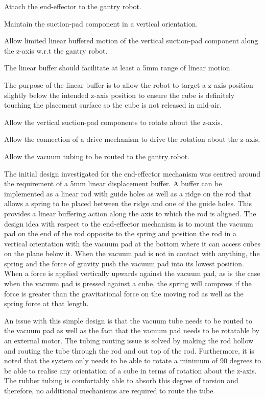 \begin{compactitem}
	\item Attach the end-effector to the gantry robot.
	\item Maintain the suction-pad component in a vertical orientation.
	\item Allow limited linear buffered motion of the vertical suction-pad component along the z-axis w.r.t the gantry robot.
	\item The linear buffer should facilitate at least a 5mm range of linear motion.
	\item The purpose of the linear buffer is to allow the robot to target a z-axis position slightly below the intended z-axis position to ensure the cube is definitely touching the placement surface so the cube is not released in mid-air.
	\item Allow the vertical suction-pad components to rotate about the z-axis.
	\item Allow the connection of a drive mechanism to drive the rotation about the z-axis.
	\item Allow the vacuum tubing to be routed to the gantry robot.
\end{compactitem}

The initial design investigated for the end-effector mechanism was centred around the requirement of a 5mm linear displacement buffer. A buffer can be implemented as a linear rod with guide holes as well as a ridge on the rod that allows a spring to be placed between the ridge and one of the guide holes. This provides a linear buffering action along the axis to which the rod is aligned. The design idea with respect to the end-effector mechanism is to mount the vacuum pad on the end of the rod opposite to the spring and position the rod in a vertical orientation with the vacuum pad at the bottom where it can access cubes on the plane below it. When the vacuum pad is not in contact with anything, the spring and the force of gravity push the vacuum pad into its lowest position. When a force is applied vertically upwards against the vacuum pad, as is the case when the vacuum pad is pressed against a cube, the spring will compress if the force is greater than the gravitational force on the moving rod as well as the spring force at that length.

An issue with this simple design is that the vacuum tube needs to be routed to the vacuum pad as well as the fact that the vacuum pad needs to be rotatable by an external motor. The tubing routing issue is solved by making the rod hollow and routing the tube through the rod and out top of the rod. Furthermore, it is noted that the system only needs to be able to rotate a minimum of 90 degrees to be able to realise any orientation of a cube in terms of rotation about the z-axis. The rubber tubing is comfortably able to absorb this degree of torsion and therefore, no additional mechanisms are required to route the tube.

